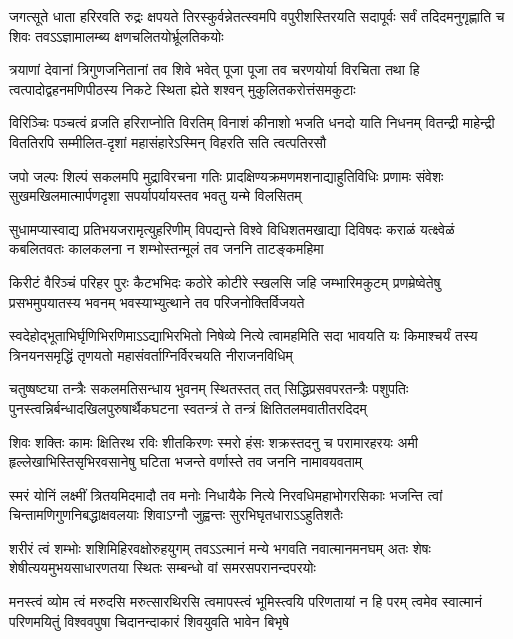 \fourlineindentedshloka
{जगत्सूते धाता हरिरवति रुद्रः क्षपयते}
{तिरस्कुर्वन्नेतत्स्वमपि वपुरीशस्तिरयति}
{सदापूर्वः सर्वं तदिदमनुगृह्णाति च शिवः}
{तवऽऽज्ञामालम्ब्य क्षणचलितयोर्भ्रूलतिकयोः}%

\fourlineindentedshloka
{त्रयाणां देवानां त्रिगुणजनितानां तव शिवे}
{भवेत् पूजा पूजा तव चरणयोर्या विरचिता}
{तथा हि त्वत्पादोद्वहनमणिपीठस्य निकटे}
{स्थिता ह्येते शश्वन् मुकुलितकरोत्तंसमकुटाः}%

\fourlineindentedshloka
{विरिञ्चिः पञ्चत्वं व्रजति हरिराप्नोति विरतिम्}
{विनाशं कीनाशो भजति धनदो याति निधनम्}
{वितन्द्री माहेन्द्री विततिरपि सम्मीलित-दृशां}
{महासंहारेऽस्मिन् विहरति सति त्वत्पतिरसौ}%

\fourlineindentedshloka
{जपो जल्पः शिल्पं सकलमपि मुद्राविरचना}
{गतिः प्रादक्षिण्यक्रमणमशनाद्याहुतिविधिः}
{प्रणामः संवेशः सुखमखिलमात्मार्पणदृशा}
{सपर्यापर्यायस्तव भवतु यन्मे विलसितम्}%

\fourlineindentedshloka
{सुधामप्यास्वाद्य प्रतिभयजरामृत्युहरिणीम्}
{विपद्यन्ते विश्वे विधिशतमखाद्या दिविषदः}
{कराळं यत्क्ष्वेळं कबलितवतः कालकलना}
{न शम्भोस्तन्मूलं तव जननि ताटङ्कमहिमा}%

\fourlineindentedshloka
{किरीटं वैरिञ्चं परिहर पुरः कैटभभिदः}
{कठोरे कोटीरे स्खलसि जहि जम्भारिमकुटम्}
{प्रणम्रेष्वेतेषु प्रसभमुपयातस्य भवनम्}
{भवस्याभ्युत्थाने तव परिजनोक्तिर्विजयते}%

\fourlineindentedshloka
{स्वदेहोद्भूताभिर्घृणिभिरणिमाऽऽद्याभिरभितो}
{निषेव्ये नित्ये त्वामहमिति सदा भावयति यः}
{किमाश्चर्यं तस्य त्रिनयनसमृद्धिं तृणयतो}
{महासंवर्ताग्निर्विरचयति नीराजनविधिम्}%

\fourlineindentedshloka
{चतुष्षष्ट्या तन्त्रैः सकलमतिसन्धाय भुवनम्}
{स्थितस्तत् तत्  सिद्धिप्रसवपरतन्त्रैः पशुपतिः}
{पुनस्त्वन्निर्बन्धादखिलपुरुषार्थैकघटना}
{स्वतन्त्रं ते तन्त्रं क्षितितलमवातीतरदिदम्}%

\fourlineindentedshloka
{शिवः शक्तिः कामः क्षितिरथ रविः शीतकिरणः}
{स्मरो हंसः शक्रस्तदनु च परामारहरयः}
{अमी हृल्लेखाभिस्तिसृभिरवसानेषु घटिता}
{भजन्ते वर्णास्ते तव जननि नामावयवताम्}%

\fourlineindentedshloka
{स्मरं योनिं लक्ष्मीं त्रितयमिदमादौ तव मनोः}
{निधायैके नित्ये निरवधिमहाभोगरसिकाः}
{भजन्ति त्वां चिन्तामणिगुणनिबद्धाक्षवलयाः}
{शिवाऽग्नौ जुह्वन्तः सुरभिघृतधाराऽऽहुतिशतैः}%

\fourlineindentedshloka
{शरीरं त्वं शम्भोः शशिमिहिरवक्षोरुहयुगम्}
{तवऽऽत्मानं मन्ये भगवति नवात्मानमनघम्}
{अतः शेषः शेषीत्ययमुभयसाधारणतया}
{स्थितः सम्बन्धो वां समरसपरानन्दपरयोः}%

\fourlineindentedshloka
{मनस्त्वं व्योम त्वं मरुदसि मरुत्सारथिरसि}
{त्वमापस्त्वं भूमिस्त्वयि परिणतायां न हि परम्}
{त्वमेव स्वात्मानं परिणमयितुं विश्ववपुषा}
{चिदानन्दाकारं शिवयुवति भावेन बिभृषे}%

